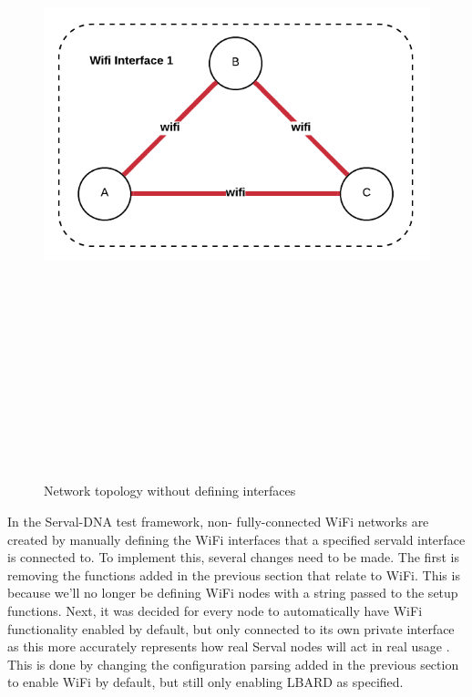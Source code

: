 \begin{figure}
    \begin{centering}
        \includegraphics[width=14cm,height=20cm,keepaspectratio]{Figures/networkWifiInterface1.png}
        \caption{Network topology without defining interfaces}
        \label{fig:networkWifi1}
    \end{centering}
\end{figure}


In the Serval-DNA test framework, non- fully-connected WiFi networks are created by manually defining the WiFi interfaces that a specified servald interface is connected to.
To implement this, several changes need to be made.
The first is removing the functions added in the previous section that relate to WiFi.
This is because we'll no longer be defining WiFi nodes with a string passed to the setup functions.
Next, it was decided for every node to automatically have WiFi functionality enabled by default, but only connected to its own private interface as this more accurately represents how real Serval nodes will act in real usage . 
This is done by changing the configuration parsing added in the previous section to enable WiFi by default, but still only enabling LBARD as specified.

